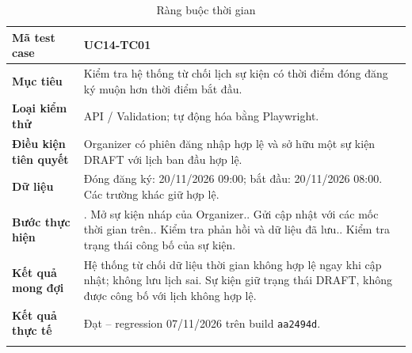 \begin{table}[H]
\centering
\begingroup\small
\renewcommand{\arraystretch}{1.18}
\caption{Ràng buộc thời gian}\label{tab:i1-detail-4}
\begin{tabularx}{\linewidth}{@{}p{.23\linewidth}>{\raggedright\arraybackslash}X@{}}
\toprule
\textbf{Mã test case} & \textbf{UC14-TC01} \\\midrule
\textbf{Mục tiêu} & Kiểm tra hệ thống từ chối lịch sự kiện có thời điểm đóng đăng ký muộn hơn thời điểm bắt đầu. \\ \addlinespace[3pt]
\textbf{Loại kiểm thử} & API / Validation; tự động hóa bằng Playwright. \\ \addlinespace[3pt]
\textbf{Điều kiện tiên quyết} & Organizer có phiên đăng nhập hợp lệ và sở hữu một sự kiện DRAFT với lịch ban đầu hợp lệ. \\ \addlinespace[3pt]
\textbf{Dữ liệu} & Đóng đăng ký: 20/11/2026 09:00; bắt đầu: 20/11/2026 08:00. Các trường khác giữ hợp lệ. \\ \addlinespace[3pt]
\textbf{Bước thực hiện} & 1. Mở sự kiện nháp của Organizer.\newline 2. Gửi cập nhật với các mốc thời gian trên.\newline 3. Kiểm tra phản hồi và dữ liệu đã lưu.\newline 4. Kiểm tra trạng thái công bố của sự kiện. \\ \addlinespace[3pt]
\textbf{Kết quả mong đợi} & Hệ thống từ chối dữ liệu thời gian không hợp lệ ngay khi cập nhật; không lưu lịch sai. Sự kiện giữ trạng thái DRAFT, không được công bố với lịch không hợp lệ. \\ \addlinespace[3pt]
\textbf{Kết quả thực tế} & Đạt -- regression 07/11/2026 trên build \texttt{aa2494d}.\\ \addlinespace[3pt]
\bottomrule
\end{tabularx}
\endgroup
\end{table}

